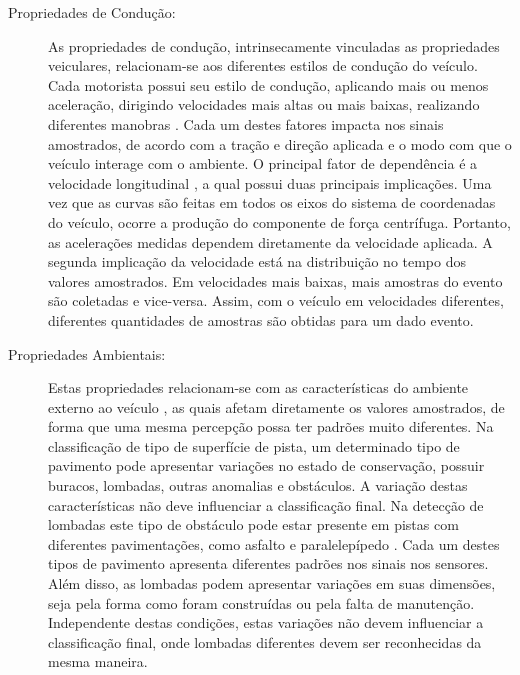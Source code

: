 \begin{description}
	\item [Propriedades de Condução:] 
	
	As propriedades de condução, intrinsecamente vinculadas as propriedades veiculares, relacionam-se aos diferentes estilos de condução do veículo.  Cada motorista possui seu estilo de condução, aplicando mais ou menos aceleração, dirigindo velocidades mais altas ou mais baixas, realizando diferentes manobras \cite{Alam2020}. Cada um destes fatores impacta nos sinais amostrados, de acordo com a tração e direção aplicada e o modo com que o veículo interage com o ambiente. O principal fator de dependência é a velocidade longitudinal \cite{Brunauer2016,Douangphachanh2013,Gueta2017,Kumar2017,Lima2016,M.2017,Nalavde2015,Singh2017,Alam2020}, a qual possui duas principais implicações. Uma vez que as curvas são feitas em todos os eixos do sistema de coordenadas do veículo, ocorre a produção do componente de força centrífuga. Portanto, as acelerações medidas dependem diretamente da velocidade aplicada. A segunda implicação da velocidade está na distribuição no tempo dos valores amostrados. Em velocidades mais baixas, mais amostras do evento são coletadas e vice-versa. Assim, com o veículo em velocidades diferentes, diferentes quantidades de amostras são obtidas para um dado evento.

	\item [Propriedades Ambientais:] 
	
	Estas propriedades relacionam-se com as características do ambiente externo ao veículo \cite{Alam2020}, as quais afetam diretamente os valores amostrados, de forma que uma mesma percepção possa ter padrões muito diferentes. Na classificação de tipo de superfície de pista, um determinado tipo de pavimento pode apresentar variações no estado de conservação, possuir buracos, lombadas, outras anomalias e obstáculos. A variação destas características não deve influenciar a classificação final. Na detecção de lombadas este tipo de obstáculo pode estar presente em pistas com diferentes pavimentações, como asfalto e paralelepípedo \cite{Masino2017}. Cada um destes tipos de pavimento apresenta diferentes padrões nos sinais nos sensores. Além disso, as lombadas podem apresentar variações em suas dimensões, seja pela forma como foram construídas ou pela falta de manutenção. Independente destas condições, estas variações não devem influenciar a classificação final, onde lombadas diferentes devem ser reconhecidas da mesma maneira.
	 
\end{description}

